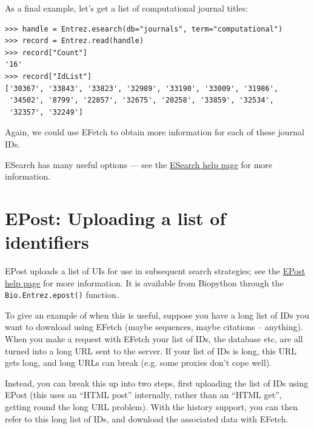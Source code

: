 \documentclass{report}
\begin{document}
As a final example, let's get a list of computational journal titles:
\begin{verbatim}
>>> handle = Entrez.esearch(db="journals", term="computational")
>>> record = Entrez.read(handle)
>>> record["Count"]
'16'
>>> record["IdList"]
['30367', '33843', '33823', '32989', '33190', '33009', '31986',
 '34502', '8799', '22857', '32675', '20258', '33859', '32534',
 '32357', '32249']
\end{verbatim}
Again, we could use EFetch to obtain more information for each of these journal IDs.

ESearch has many useful options --- see the \href{http://www.ncbi.nlm.nih.gov/entrez/query/static/esearch\_help.html}{ESearch help page} for more information.

\section{EPost: Uploading a list of identifiers}
EPost uploads a list of UIs for use in subsequent search strategies; see the
\href{http://www.ncbi.nlm.nih.gov/entrez/query/static/epost\_help.html}{EPost help page} for more information. It is available from Biopython through
the \verb+Bio.Entrez.epost()+ function.

To give an example of when this is useful, suppose you have a long list of IDs
you want to download using EFetch (maybe sequences, maybe citations --
anything). When you make a  request with EFetch your list of IDs, the database
etc, are all turned into a long URL sent to the server.  If your list of IDs is
long, this URL gets long, and long URLs can break (e.g. some proxies don't
cope well).

Instead, you can break this up into two steps, first uploading the list of IDs
using EPost (this uses an ``HTML post'' internally, rather than an ``HTML get'',
getting round the long URL problem).  With the history support, you can then
refer to this long list of IDs, and download the associated data with EFetch.
\end{document}
